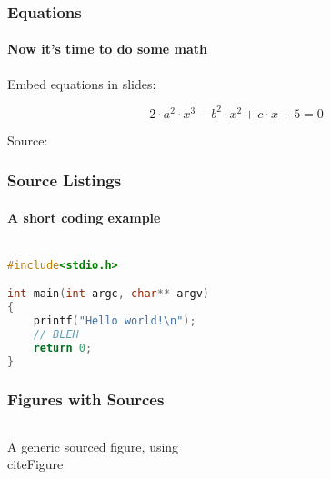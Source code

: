 \begin{frame}[label=MATHFRAME]
\frametitle{Equations}
\framesubtitle{Now it's time to do some math}

Embed equations in slides:

\begin{equation}
2 \cdot a^{2} \cdot x^{3} - b^{2} \cdot x^{2} + c \cdot x + 5 = 0
\end{equation}

Source: \cite{LaValle}


\end{frame}



\begin{frame}[fragile,label=CODEFRAME]
\frametitle{Source Listings}
\framesubtitle{A short coding example}

\begin{lstlisting}[language=C,basicstyle=\ttfamily]

#include<stdio.h>

int main(int argc, char** argv)
{
    printf("Hello world!\n");
    // BLEH
    return 0;
}

\end{lstlisting}

\end{frame}


\begin{frame}
    \frametitle{Figures with Sources}


    \begin{columns}
        \begin{column}{0.7\textwidth}

            A generic sourced figure, using \\citeFigure

        \end{column}
        \begin{column}{0.3\textwidth}


        \end{column}
    \end{columns}


\end{frame}



